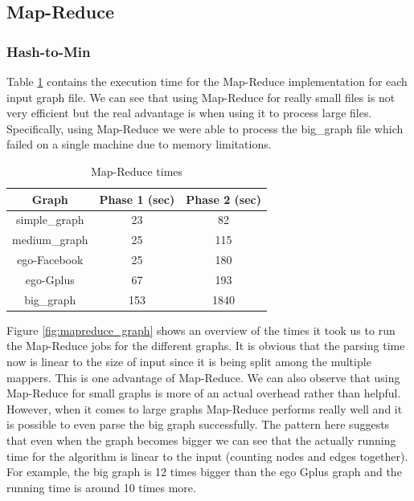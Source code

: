 \subsection{Map-Reduce}

\subsubsection{Hash-to-Min}

Table \ref{tb:MapReducetimes} contains the execution time for the Map-Reduce implementation for each input graph file. We can see that using Map-Reduce for really small files is not very efficient but the real advantage is when using it to process large files. Specifically,  using Map-Reduce we were able to process the big\_graph file which failed on a single machine due to memory limitations.

\begin{table}[h!]
\footnotesize
\begin{center}
\begin{tabular}{|c|c|c|}
\hline
{\bf Graph} & {\bf Phase 1 (sec)} & {\bf Phase 2 (sec)}\\
\hline
\hline
simple\_graph   & 23  & 82 \\
\hline
medium\_graph   & 25 & 115 \\
\hline
ego-Facebook   & 25 & 180 \\
\hline
ego-Gplus   & 67  & 193 \\
\hline
big\_graph   & 153 & 1840 \\
\hline
\end{tabular}
\caption{Map-Reduce times}
\label{tb:MapReducetimes}
\end{center}
\end{table}

Figure \ref{fig:mapreduce_graph} shows an overview of the times it took us to run the Map-Reduce jobs for the different graphs. It is obvious that the parsing time now is linear to the size of input since it is being split among the multiple mappers. This is one advantage of Map-Reduce. We can also observe that using Map-Reduce for small graphs is more of an actual overhead rather than helpful. However, when it comes to large graphs Map-Reduce performs really well and it is possible to even parse the big graph successfully. The pattern here suggests that even when the graph becomes bigger we can see that the actually running time for the algorithm is linear to the input (counting nodes and edges together). For example, the big graph is 12 times bigger than the ego Gplus graph and the running time is around 10 times more.

